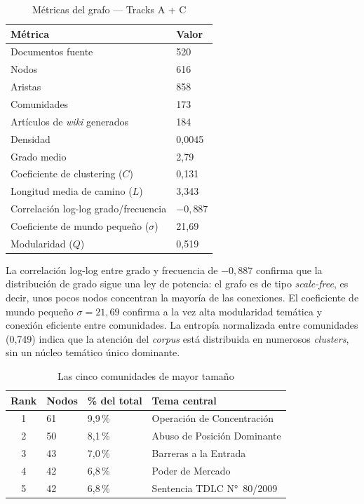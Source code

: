 \documentclass[12pt,a4paper]{article}
\begin{document}
\begin{table}[htbp]
\centering
\caption{Métricas del grafo — Tracks A + C}
\label{tab:metricas-grafo}
\small
\begin{tabular}{ll}
\toprule
\rowcolor{tabhead}\color{black}\textbf{Métrica} & \color{black}\textbf{Valor} \\
\midrule
Documentos fuente & 520 \\
Nodos & 616 \\
Aristas & 858 \\
Comunidades & 173 \\
Artículos de \textit{wiki} generados & 184 \\
Densidad & 0{,}0045 \\
Grado medio & 2{,}79 \\
Coeficiente de clustering ($C$) & 0{,}131 \\
Longitud media de camino ($L$) & 3{,}343 \\
Correlación log-log grado/frecuencia & $-0{,}887$ \\
Coeficiente de mundo pequeño ($\sigma$) & 21{,}69 \\
Modularidad ($Q$) & 0{,}519 \\
\bottomrule
\end{tabular}
\end{table}

\noindent
La correlación log-log entre grado y frecuencia de $-0{,}887$ confirma que la distribución de grado
sigue una ley de potencia: el grafo es de tipo \emph{scale-free}, es decir,
unos pocos nodos concentran la mayoría de las conexiones. El coeficiente de
mundo pequeño $\sigma = 21{,}69$ confirma a la vez alta modularidad temática y
conexión eficiente entre comunidades. La entropía normalizada entre comunidades
(0{,}749) indica que la atención del \textit{corpus} está distribuida en numerosos
\textit{clusters}, sin un núcleo temático único dominante.

\begin{table}[htbp]
\centering
\caption{Las cinco comunidades de mayor tamaño}
\label{tab:comunidades}
\small
\begin{tabular}{clll}
\toprule
\rowcolor{tabhead}\color{black}\textbf{Rank} &
  \color{black}\textbf{Nodos} &
  \color{black}\textbf{\% del total} &
  \color{black}\textbf{Tema central} \\
\midrule
1 & 61 & 9{,}9\,\% & Operación de Concentración \\
2 & 50 & 8{,}1\,\% & Abuso de Posición Dominante \\
3 & 43 & 7{,}0\,\% & Barreras a la Entrada \\
4 & 42 & 6{,}8\,\% & Poder de Mercado \\
5 & 42 & 6{,}8\,\% & Sentencia TDLC N°~80/2009 \\
\bottomrule
\end{tabular}
\end{table}
\end{document}
